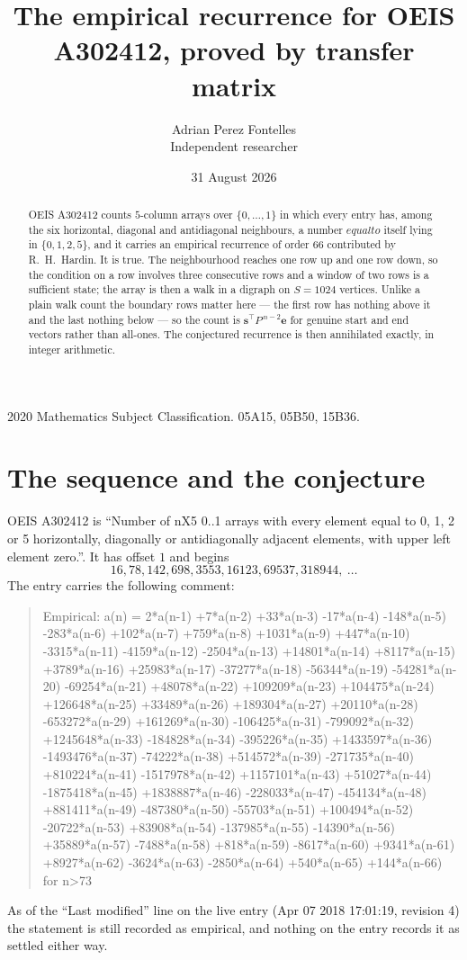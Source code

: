 \documentclass[11pt,a4paper]{article}
\title{The empirical recurrence for OEIS A302412, proved by transfer matrix}
\author{Adrian Perez Fontelles\\ \small Independent researcher}
\date{31 August 2026}
\theoremstyle{plain}
\theoremstyle{definition}
\begin{document}
\maketitle

\begin{abstract}
OEIS A302412 counts $5$-column arrays over $\{0,\dots,1\}$ in which every entry has,
among the six horizontal, diagonal and antidiagonal neighbours, a number $equal to$ itself lying in $\{0,1,2,5\}$, and it carries an empirical
recurrence of order $66$ contributed by R.~H.~Hardin. It is true. The neighbourhood
reaches one row up and one row down, so the condition on a row involves three consecutive
rows and a window of two rows is a sufficient state; the array is then a walk in a digraph
on $S=1024$ vertices. Unlike a plain walk count the boundary rows matter here --- the first
row has nothing above it and the last nothing below --- so the count is
$\mathbf{s}^{\!\top}P^{\,n-2}\mathbf{e}$ for genuine start and end vectors rather than
all-ones. The conjectured recurrence is then annihilated exactly, in integer arithmetic.
\end{abstract}

\noindent\small 2020 Mathematics Subject Classification. 05A15, 05B50, 15B36.\normalsize

\section{The sequence and the conjecture}

OEIS A302412 is ``Number of nX5 0..1 arrays with every element equal to 0, 1, 2 or 5 horizontally, diagonally or antidiagonally adjacent elements, with upper left element zero.''. It has offset
$1$ and begins
\[
16, 78, 142, 698, 3553, 16123, 69537, 318944,\ \dots
\]
The entry carries the following comment:
\begin{quote}\small
Empirical: a(n) = 2*a(n-1) +7*a(n-2) +33*a(n-3) -17*a(n-4) -148*a(n-5) -283*a(n-6) +102*a(n-7) +759*a(n-8) +1031*a(n-9) +447*a(n-10) -3315*a(n-11) -4159*a(n-12) -2504*a(n-13) +14801*a(n-14) +8117*a(n-15) +3789*a(n-16) +25983*a(n-17) -37277*a(n-18) -56344*a(n-19) -54281*a(n-20) -69254*a(n-21) +48078*a(n-22) +109209*a(n-23) +104475*a(n-24) +126648*a(n-25) +33489*a(n-26) +189304*a(n-27) +20110*a(n-28) -653272*a(n-29) +161269*a(n-30) -106425*a(n-31) -799092*a(n-32) +1245648*a(n-33) -184828*a(n-34) -395226*a(n-35) +1433597*a(n-36) -1493476*a(n-37) -74222*a(n-38) +514572*a(n-39) -271735*a(n-40) +810224*a(n-41) -1517978*a(n-42) +1157101*a(n-43) +51027*a(n-44) -1875418*a(n-45) +1838887*a(n-46) -228033*a(n-47) -454134*a(n-48) +881411*a(n-49) -487380*a(n-50) -55703*a(n-51) +100494*a(n-52) -20722*a(n-53) +83908*a(n-54) -137985*a(n-55) -14390*a(n-56) +35889*a(n-57) -7488*a(n-58) +818*a(n-59) -8617*a(n-60) +9341*a(n-61) +8927*a(n-62) -3624*a(n-63) -2850*a(n-64) +540*a(n-65) +144*a(n-66) for n>73
\end{quote}
As of the ``Last modified'' line on the live entry (Apr 07 2018 17:01:19, revision
4) the statement is still recorded as empirical, and nothing on the entry
records it as settled either way.
\end{document}
